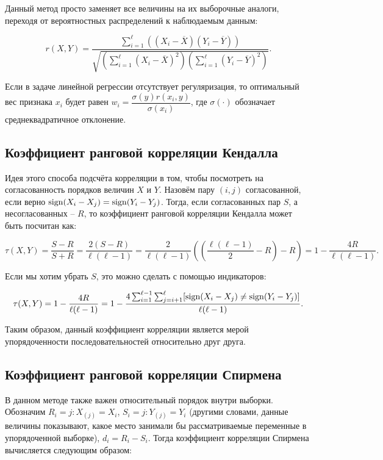 \documentclass[12pt,fleqn]{article}
\begin{document}
	Данный метод просто заменяет все величины на их выборочные аналоги, переходя от вероятностных распределений к наблюдаемым данным:

	\[
	r(X, Y) =
	\dfrac{\sum_{i = 1}^{\ell}\left(\left(X_{i} - \overline{X}\right)\left(Y_{i} - \overline{Y}\right)\right)}{\sqrt{\left(\sum_{i = 1}^{\ell}\left(X_{i} - \overline{X}\right)^{2}\right)\left(\sum_{i = 1}^{\ell}\left(Y_{i} - \overline{Y}\right)^{2}\right)}}.
	\]

	Если в задаче линейной регрессии отсутствует регуляризация, то оптимальный вес признака $ x_{i} $ будет равен $ w_{i} = \dfrac{\sigma(y)r(x_{i}, y)}{\sigma(x_{i})} $, где $ \sigma(\cdot) $ обозначает среднеквадратичное отклонение.

	\subsection{Коэффициент ранговой корреляции Кендалла}

	Идея этого способа подсчёта корреляции в том, чтобы посмотреть на согласованность порядков величин $ X $ и $ Y $. Назовём пару $ (i, j) $ согласованной, если верно $ \mathop{\rm sign}\limits(X_{i} - X_{j}) = \mathop{\rm sign}\limits(Y_{i} - Y_{j}) $. Тогда, если согласованных пар $ S $, а несогласованных – $ R $, то коэффициент ранговой корреляции Кендалла может быть посчитан как:

	\[
	\tau(X, Y) =
	\dfrac{S - R}{S + R} =
	\dfrac{2(S - R)}{\ell(\ell - 1)} =
	\dfrac{2}{\ell(\ell - 1)}\left(\left(\dfrac{\ell(\ell - 1)}{2} - R\right) - R\right) = 1 - \dfrac{4R}{\ell(\ell - 1)}.
	\]

	Если мы хотим убрать $ S $, это можно сделать с помощью индикаторов:

	\[
	\tau(X, Y) =
	1 - \dfrac{4R}{\ell(\ell - 1)} =
	1 - \dfrac{4\sum_{i = 1}^{\ell - 1}\sum_{j = i + 1}^{\ell}[\mathop{\rm sign}\limits(X_{i} - X_{j}) \neq \mathop{\rm sign}\limits(Y_{i} - Y_{j})]}{\ell(\ell - 1)}.
	\]

	Таким образом, данный коэффициент корреляции является мерой упорядоченности последовательностей относительно друг друга.

	\subsection{Коэффициент ранговой корреляции Спирмена}

	В данном методе также важен относительный порядок внутри выборки. Обозначим $ R_{i} = j : X_{(j)} = X_{i} $, $ S_{i} = j : Y_{(j)} = Y_{i} $ (другими словами, данные величины показывают, какое место занимали бы рассматриваемые переменные в упорядоченной выборке), $ d_{i} = R_{i} - S_{i} $. Тогда коэффициент корреляции Спирмена вычисляется следующим образом:
\end{document}
